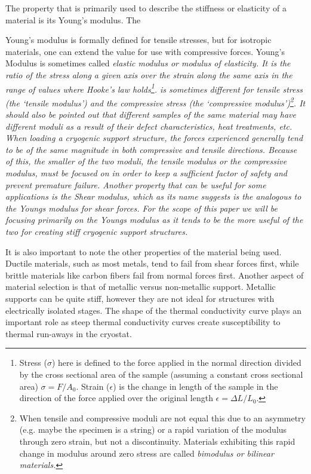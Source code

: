 \documentclass[final]{svjour2}
\begin{document}
The property that is primarily used to describe the stiffness or elasticity of a material is its Young's modulus.  The {Young's modulus is formally defined for tensile stresses, but for isotropic materials, one can extend the value for use with compressive forces. Young's Modulus is sometimes called \em{elastic modulus} or \em{modulus of elasticity}. It is the ratio of the stress along a given axis over the strain along the same axis in the range of values where Hooke's law holds\footnote{Stress ($\sigma$) here is defined to the force applied in the normal direction divided by the cross sectional area of the sample (assuming a constant cross sectional area) $\sigma = F/A_{0}$.  Strain ($\epsilon$) is the change in length of the sample in the direction of the force applied over the original length $\epsilon=\Delta L/L_{0}$.}.   is sometimes different for tensile stress (the `tensile modulus') and the compressive stress (the `compressive modulus')\footnote{When tensile and compressive moduli are not equal this due to an asymmetry (e.g. maybe the specimen is a string) or a rapid variation of the modulus through zero strain, but not a discontinuity. Materials exhibiting this rapid change in modulus around zero stress are called \em{bimodulus} or \em{bilinear} materials.}. It should also be pointed out that different samples of the same material may have different moduli as a result of their defect characteristics, heat treatments, etc. When loading a cryogenic support structure, the forces experienced generally tend to be of the same magnitude in both compressive and tensile directions.  Because of this, the smaller of the two moduli, the tensile modulus or the compressive modulus, must be focused on in order to keep a sufficient factor of safety and prevent premature failure. Another property that can be useful for some applications is the Shear modulus, which as its name suggests is the analogous to the Youngs modulus for shear forces.  For the scope of this paper we will be focusing primarily on the Youngs modulus as it tends to be the more useful of the two for creating stiff cryogenic support structures. 

It is also important to note the other properties of the material being used.  Ductile materials, such as most metals, tend to fail from shear forces first, while brittle materials like carbon fibers fail from normal forces first.  Another aspect of material selection is that of metallic versus non-metallic support. Metallic supports can be quite stiff, however they are not ideal for structures with electrically isolated stages.  The shape of the thermal conductivity curve plays an important role as steep thermal conductivity curves create susceptibility to thermal run-aways in the cryostat.

}
\end{document}
